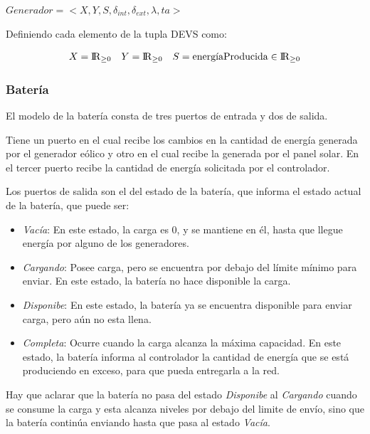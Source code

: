 $Generador = <X,Y,S,\delta_{int}, \delta_{ext}, \lambda, ta>$

Definiendo cada elemento de la tupla DEVS como:

\begin{align*}
X &= {\rm I\!R}_{\geq0} & Y &= {\rm I\!R}_{\geq0} & S &= \text{energíaProducida} \in {\rm I\!R}_{\geq 0} \\
\end{align*}




\subsubsection{Batería}
El modelo de la batería consta de tres puertos de entrada y dos de salida.

Tiene un puerto en el cual recibe los cambios en la cantidad de energía generada
por el generador eólico y otro en el cual recibe la generada por el panel solar.
En el tercer puerto recibe la cantidad de energía solicitada por el controlador.

Los puertos de salida son el del estado de la batería, que informa el estado actual
de la batería, que puede ser:

\begin{itemize}
    \item \emph{Vacía}: En este estado, la carga es 0, y se mantiene en él, hasta
        que llegue energía por alguno de los generadores.
    \item \emph{Cargando}: Posee carga, pero se encuentra por debajo del límite
        mínimo para enviar. En este estado, la batería no hace disponible la carga.
    \item \emph{Disponibe}: En este estado, la batería ya se encuentra disponible
        para enviar carga, pero aún no esta llena.
    \item \emph{Completa}: Ocurre cuando la carga alcanza la máxima capacidad. En este
        estado, la batería informa al controlador la cantidad de energía que se está
        produciendo en exceso, para que pueda entregarla a la red.
\end{itemize}

Hay que aclarar que la batería no pasa del estado \emph{Disponibe} al \emph{Cargando}
cuando se consume la carga y esta alcanza niveles por debajo del limite de envío, sino que
la batería continúa enviando hasta que pasa al estado \emph{Vacía}.

